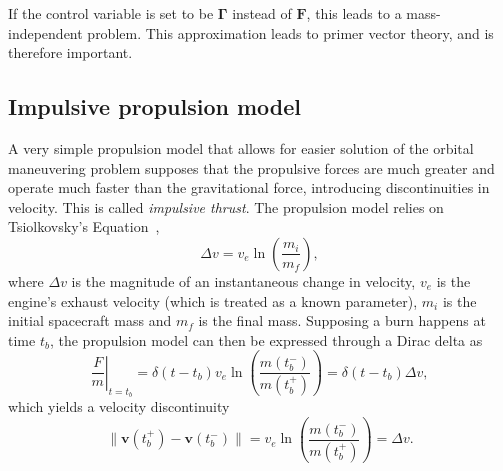 If the control variable is set to be \(\mathbf{\Gamma}\) instead of \(\mathbf{F}\), this leads to a mass-independent problem. This approximation leads to primer vector theory, and is therefore important. 


\subsection{Impulsive propulsion model}


A very simple propulsion model that allows for easier solution of the orbital maneuvering problem supposes that the propulsive forces are much greater and operate much faster than the gravitational force, introducing discontinuities in velocity. This is called \textit{impulsive thrust}. The propulsion model relies on Tsiolkovsky's Equation~\cite{Conway_2010}, 
\begin{equation}
    \Delta v = v_e \ln{\left(\frac{m_i}{m_f}\right)},
\end{equation}
where \(\Delta v\) is the magnitude of an instantaneous change in velocity, \(v_e\) is the engine's exhaust velocity (which is treated as a known parameter), \(m_i\) is the initial spacecraft mass and \(m_f\) is the final mass. Supposing a burn happens at time \(t_b\), the propulsion model can then be expressed through a Dirac delta as
\begin{equation}
    \left.\frac{F}{m}\right\vert_{t = t_b} = \delta(t - t_b) v_e \ln{\left(\frac{m(t_b^-)}{m(t_b^+)} \right)} = \delta(t - t_b) \Delta v,
\end{equation}
which yields a velocity discontinuity
\begin{equation}
    \lVert \mathbf{v}(t_b^+) - \mathbf{v}(t_b^-) \rVert = v_e \ln{\left(\frac{m(t_b^-)}{m(t_b^+)}\right)} = \Delta v.
\end{equation}

